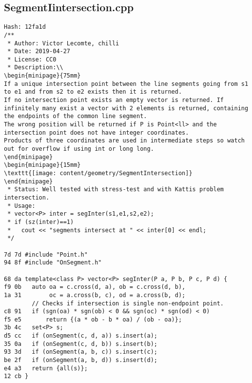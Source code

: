 \documentclass[11pt, a4paper, twoside]{article}
\begin{document}
\subsection{SegmentIintersection.cpp}
\begin{lstlisting}
Hash: 12fa1d
/**
 * Author: Victor Lecomte, chilli
 * Date: 2019-04-27
 * License: CC0
 * Description:\\
\begin{minipage}{75mm}
If a unique intersection point between the line segments going from s1 to e1 and from s2 to e2 exists then it is returned.
If no intersection point exists an empty vector is returned. If infinitely many exist a vector with 2 elements is returned, containing the endpoints of the common line segment.
The wrong position will be returned if P is Point<ll> and the intersection point does not have integer coordinates.
Products of three coordinates are used in intermediate steps so watch out for overflow if using int or long long.
\end{minipage}
\begin{minipage}{15mm}
\texttt{[image: content/geometry/SegmentIntersection]}
\end{minipage}
 * Status: Well tested with stress-test and with Kattis problem intersection.
 * Usage:
 * vector<P> inter = segInter(s1,e1,s2,e2);
 * if (sz(inter)==1)
 *   cout << "segments intersect at " << inter[0] << endl;
 */

7d 7d #include "Point.h"
94 8f #include "OnSegment.h"

68 da template<class P> vector<P> segInter(P a, P b, P c, P d) {
f9 0b 	auto oa = c.cross(d, a), ob = c.cross(d, b),
1a 31 	     oc = a.cross(b, c), od = a.cross(b, d);
      	// Checks if intersection is single non-endpoint point.
c8 91 	if (sgn(oa) * sgn(ob) < 0 && sgn(oc) * sgn(od) < 0)
f5 e5 		return {(a * ob - b * oa) / (ob - oa)};
3b 4c 	set<P> s;
d5 cc 	if (onSegment(c, d, a)) s.insert(a);
35 0a 	if (onSegment(c, d, b)) s.insert(b);
93 3d 	if (onSegment(a, b, c)) s.insert(c);
be 2f 	if (onSegment(a, b, d)) s.insert(d);
e4 a3 	return {all(s)};
12 cb }
\end{lstlisting}
\end{document}
